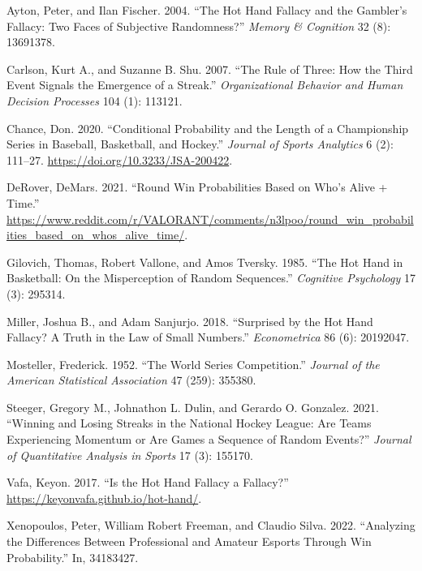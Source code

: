 \documentclass{article}
\newlength{\cslhangindent}
\newlength{\cslentryspacingunit} %
\newenvironment{CSLReferences}[2] %
 {%
  \setlength{\parindent}{0pt}
  \ifodd #1
  \let\oldpar\par
  \def\par{\hangindent=\cslhangindent\oldpar}
  \fi
  \setlength{\parskip}{#2\cslentryspacingunit}
 }%
 {}
\begin{document}
\hypertarget{refs}{}
\begin{CSLReferences}{1}{0}
\leavevmode{}%
Ayton, Peter, and Ilan Fischer. 2004. {``The Hot Hand Fallacy and the
Gambler{'}s Fallacy: Two Faces of Subjective Randomness?''} \emph{Memory
\& Cognition} 32 (8): 13691378.

\leavevmode{}%
Carlson, Kurt A., and Suzanne B. Shu. 2007. {``The Rule of Three: How
the Third Event Signals the Emergence of a Streak.''}
\emph{Organizational Behavior and Human Decision Processes} 104 (1):
113121.

\leavevmode{}%
Chance, Don. 2020. {``Conditional Probability and the Length of a
Championship Series in Baseball, Basketball, and Hockey.''}
\emph{Journal of Sports Analytics} 6 (2): 111--27.
\url{https://doi.org/10.3233/JSA-200422}.

\leavevmode{}%
DeRover, DeMars. 2021. {``Round Win Probabilities Based on Who's Alive +
Time.''}
\url{https://www.reddit.com/r/VALORANT/comments/n3lpoo/round_win_probabilities_based_on_whos_alive_time/}.

\leavevmode{}%
Gilovich, Thomas, Robert Vallone, and Amos Tversky. 1985. {``The Hot
Hand in Basketball: On the Misperception of Random Sequences.''}
\emph{Cognitive Psychology} 17 (3): 295314.

\leavevmode{}%
Miller, Joshua B., and Adam Sanjurjo. 2018. {``Surprised by the Hot Hand
Fallacy? A Truth in the Law of Small Numbers.''} \emph{Econometrica} 86
(6): 20192047.

\leavevmode{}%
Mosteller, Frederick. 1952. {``The World Series Competition.''}
\emph{Journal of the American Statistical Association} 47 (259): 355380.

\leavevmode{}%
Steeger, Gregory M., Johnathon L. Dulin, and Gerardo O. Gonzalez. 2021.
{``Winning and Losing Streaks in the National Hockey League: Are Teams
Experiencing Momentum or Are Games a Sequence of Random Events?''}
\emph{Journal of Quantitative Analysis in Sports} 17 (3): 155170.

\leavevmode{}%
Vafa, Keyon. 2017. {``Is the Hot Hand Fallacy a Fallacy?''}
\url{https://keyonvafa.github.io/hot-hand/}.

\leavevmode{}%
Xenopoulos, Peter, William Robert Freeman, and Claudio Silva. 2022.
{``Analyzing the Differences Between Professional and Amateur Esports
Through Win Probability.''} In, 34183427.

\end{CSLReferences}



\end{document}
